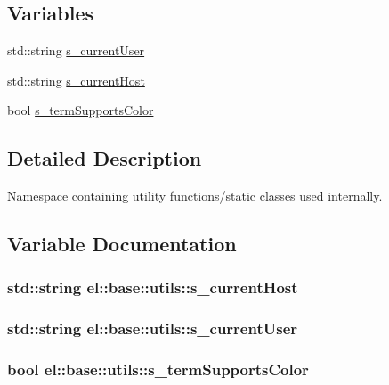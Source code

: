 \subsection*{Variables}
\begin{DoxyCompactItemize}
\item 
std\+::string \hyperlink{namespaceel_1_1base_1_1utils_ad0724db3d2fabea882fba2bcca773ebe}{s\+\_\+current\+User}
\item 
std\+::string \hyperlink{namespaceel_1_1base_1_1utils_abb6b1d2a4f838f734b6acba4a4cc15d3}{s\+\_\+current\+Host}
\item 
bool \hyperlink{namespaceel_1_1base_1_1utils_a3ab6c8c6cf5aa1bafee7bc34854f12ec}{s\+\_\+term\+Supports\+Color}
\end{DoxyCompactItemize}


\subsection{Detailed Description}
Namespace containing utility functions/static classes used internally. 

\subsection{Variable Documentation}
\hypertarget{namespaceel_1_1base_1_1utils_abb6b1d2a4f838f734b6acba4a4cc15d3}{}
\subsubsection[{s\+\_\+current\+Host}]{\setlength{\rightskip}{0pt plus 5cm}std\+::string el\+::base\+::utils\+::s\+\_\+current\+Host}\label{namespaceel_1_1base_1_1utils_abb6b1d2a4f838f734b6acba4a4cc15d3}
\hypertarget{namespaceel_1_1base_1_1utils_ad0724db3d2fabea882fba2bcca773ebe}{}
\subsubsection[{s\+\_\+current\+User}]{\setlength{\rightskip}{0pt plus 5cm}std\+::string el\+::base\+::utils\+::s\+\_\+current\+User}\label{namespaceel_1_1base_1_1utils_ad0724db3d2fabea882fba2bcca773ebe}
\hypertarget{namespaceel_1_1base_1_1utils_a3ab6c8c6cf5aa1bafee7bc34854f12ec}{}
\subsubsection[{s\+\_\+term\+Supports\+Color}]{\setlength{\rightskip}{0pt plus 5cm}bool el\+::base\+::utils\+::s\+\_\+term\+Supports\+Color}\label{namespaceel_1_1base_1_1utils_a3ab6c8c6cf5aa1bafee7bc34854f12ec}
